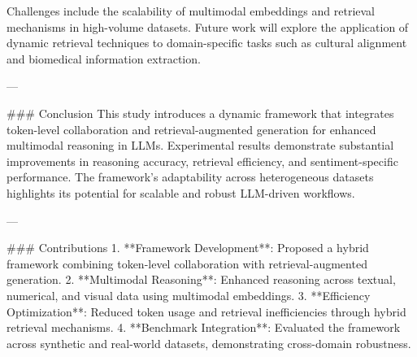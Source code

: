 Challenges include the scalability of multimodal embeddings and retrieval mechanisms in high-volume datasets. Future work will explore the application of dynamic retrieval techniques to domain-specific tasks such as cultural alignment and biomedical information extraction.

---

### Conclusion  
This study introduces a dynamic framework that integrates token-level collaboration and retrieval-augmented generation for enhanced multimodal reasoning in LLMs. Experimental results demonstrate substantial improvements in reasoning accuracy, retrieval efficiency, and sentiment-specific performance. The framework’s adaptability across heterogeneous datasets highlights its potential for scalable and robust LLM-driven workflows.

---

### Contributions  
1. **Framework Development**: Proposed a hybrid framework combining token-level collaboration with retrieval-augmented generation.  
2. **Multimodal Reasoning**: Enhanced reasoning across textual, numerical, and visual data using multimodal embeddings.  
3. **Efficiency Optimization**: Reduced token usage and retrieval inefficiencies through hybrid retrieval mechanisms.  
4. **Benchmark Integration**: Evaluated the framework across synthetic and real-world datasets, demonstrating cross-domain robustness.  